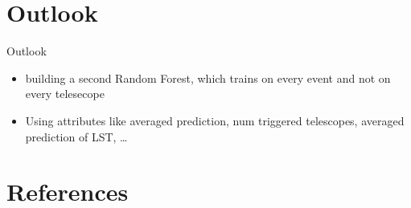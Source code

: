 \documentclass[aspectratio=1610, professionalfonts, 9pt]{beamer}
\begin{document}
\section{Outlook}
  \begin{frame}{Outlook}
    \begin{itemize}
      \item building a second Random Forest, which trains on every event and not on every telesecope
      \item Using attributes like averaged prediction, num triggered telescopes, averaged prediction of LST, \dots
    \end{itemize}
  \end{frame}
\section{References}
  \printbibliography
\end{document}
